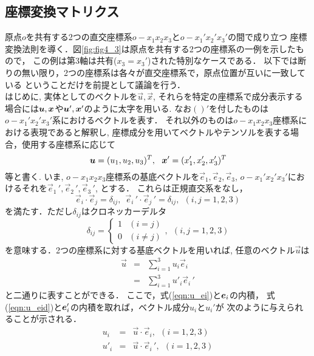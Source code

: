 \documentclass[10pt,a4j]{jbook}
\begin{document}
\subsection{座標変換マトリクス}
原点$o$を共有する2つの直交座標系$o-x_1x_2x_3$と$o-x_1'x_2'x_3'$の間で成り立つ
座標変換法則を導く．図\ref{fig:fig4_3}は原点を共有する2つの座標系の一例を示したもので，
この例は第3軸は共有($x_3=x_3'$)された特別なケースである．
以下では断りの無い限り，2つの座標系は各々が直交座標系で，原点位置が互いに一致している
ということだけを前提として議論を行う．\\
はじめに, 実体としてのベクトルを$\vec{u},\vec{x}$, それらを特定の座標系で成分表示する
場合には$\mbox{\boldmath $u$},\mbox{\boldmath $x$}$や$\mbox{\boldmath $u$}',\mbox{\boldmath $x$}'$のように太字を用いる. 
なお$()'$を付したものは$o-x_1'x_2'x_3'$系におけるベクトルを表す．
それ以外のものは$o-x_1x_2x_3$座標系における表現であると解釈し, 
座標成分を用いてベクトルやテンソルを表する場合，使用する座標系に応じて
\[
	\fat{u}=(u_1, u_2, u_3)^T, \ \ \fat{x}'=(x_1', x_2', x_3')^T
\]
等と書く.
いま, $o-x_1x_2x_3$座標系の基底ベクトルを$\vec{e}_1, \vec{e}_2, \vec{e}_3$, 
$o-x_1'x_2'x_3'$におけるそれを$\vec{e}_1\,', \vec{e}_2\,', \vec{e}_3 \,'$, 
とする． これらは正規直交系をなし，
\begin{equation}
	\vec{e}_i\cdot \vec{e}_j=\delta_{ij}, \ \ 
	\vec{e}_i\,' \cdot \vec{e}_j\,'=\delta_{ij}, \ \ (i,j=1,2,3)
	\label{eqn:ortho_norm}
\end{equation}
を満たす．ただし$\delta_{ij}$はクロネッカーデルタ
\begin{equation}
	\delta _{ij}=\left\{
	\begin{array}{cc}
		1 & (i=j) \\
		0 & (i\neq j)
	\end{array}
	\right. , \ \ (i,j=1,2,3)
	\label{eqn:dij}
\end{equation}
を意味する．2つの座標系に対する基底ベクトルを用いれば, 任意のベクトル$\vec{u}$は
\begin{eqnarray}
	\vec{u} &=& \sum_{i=1}^3 u_i\vec{e}_i 
	\label{eqn:u_ei}
	\\
	&=& \sum_{i=1}^3 u'_i\vec{e}_i\,' 
	\label{eqn:u_eid}
\end{eqnarray}
と二通りに表すことができる． ここで，式(\ref{eqn:u_ei})と$\mbox{\boldmath $e$}_i$の内積，
式(\ref{eqn:u_eid})と$\mbox{\boldmath $e$}'_i$の内積を取れば，ベクトル成分$u_i$と$u_i'$が
次のように与えられることが示される．
\begin{eqnarray}
	u_i &=& \vec{u}\cdot \vec{e}_i \label{eqn:ui} , \ \ (i=1,2,3) \\
	u'_i&=& \vec{u}\cdot \vec{e}_i\,' \label{eqn:uid}, \ \ (i=1,2,3)
\end{eqnarray}
\end{document}
